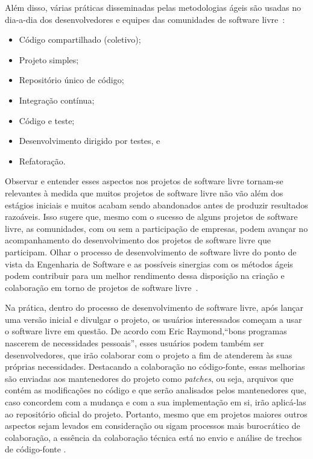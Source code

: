 Além disso, várias práticas disseminadas pelas metodologias ágeis são usadas no
dia-a-dia dos desenvolvedores e equipes das comunidades
de software livre~\cite{corbucci2011freemethods}:

\begin{itemize}

\item {Código compartilhado (coletivo);}
\item {Projeto simples;}
\item {Repositório único de código;}
\item {Integração contínua;}
\item {Código e teste;}
\item {Desenvolvimento dirigido por testes, e}
\item {Refatoração.}

\end{itemize}

Observar e entender esses aspectos nos projetos de software livre tornam-se
relevantes à medida que muitos projetos de software livre não vão além dos
estágios iniciais e muitos acabam sendo abandonados antes de produzir
resultados razoáveis.
%
Isso sugere que, mesmo com o sucesso de alguns projetos de software livre,
as comunidades, com ou sem a participação de empresas, podem avançar no
acompanhamento do desenvolvimento dos projetos de software livre que participam.
%
Olhar o processo de desenvolvimento de software livre do ponto de vista da 
Engenharia de Software e as possíveis sinergias com os métodos ágeis podem
contribuir para um melhor rendimento dessa disposição na criação e colaboração
em torno de projetos de software livre~\cite{meirelles2013metrics}.

Na prática, dentro do processo de desenvolvimento de software livre, após lançar
uma versão inicial e divulgar o projeto, os usuários interessados começam a
usar o software livre em questão. 
%
De acordo com Eric Raymond,``bons programas nascerem de
necessidades pessoais'', esses usuários podem também ser desenvolvedores, que
irão colaborar com o projeto a fim de atenderem às suas próprias necessidades.
%
Destacando a colaboração no código-fonte, essas melhorias são enviadas aos
mantenedores do projeto como \emph{patches}, ou seja, arquivos que
contém as modificações no código e que serão analisados pelos mantenedores que,
caso concordem com a mudança e com a sua implementação em si, irão
aplicá-las ao repositório oficial do projeto.
%
Portanto, mesmo que em projetos maiores outros aspectos sejam levados em consideração ou
sigam processos mais burocrático de colaboração, a essência da colaboração
técnica está no envio e análise de trechos de código-fonte \cite{meirelles2013metrics}.

